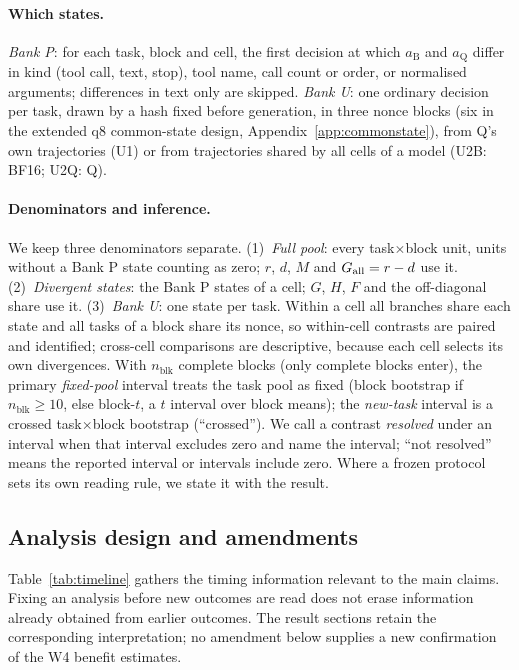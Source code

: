 \paragraph{Which states.} \emph{Bank P}: for each task, block and cell, the first decision at which $a_{\mathrm{B}}$ and $a_{\mathrm{Q}}$ differ in kind (tool call, text, stop), tool name, call count or order, or normalised arguments; differences in text only are skipped. \emph{Bank U}: one ordinary decision per task, drawn by a hash fixed before generation, in three nonce blocks (six in the extended q8 common-state design, Appendix~\ref{app:commonstate}), from Q's own trajectories (U1) or from trajectories shared by all cells of a model (U2B: BF16; U2Q: Q). %

\paragraph{Denominators and inference.} We keep three denominators separate. (1)~\emph{Full pool}: every task$\times$block unit, units without a Bank P state counting as zero; $r$, $d$, $M$ and $G_{\mathrm{all}}=r-d$ use it. (2)~\emph{Divergent states}: the Bank P states of a cell; $G$, $H$, $F$ and the off-diagonal share use it. (3)~\emph{Bank U}: one state per task. Within a cell all branches share each state and all tasks of a block share its nonce, so within-cell contrasts are paired and identified; cross-cell comparisons are descriptive, because each cell selects its own divergences. With $n_{\mathrm{blk}}$ complete blocks (only complete blocks enter), the primary \emph{fixed-pool} interval treats the task pool as fixed (block bootstrap if $n_{\mathrm{blk}}\ge10$, else block-$t$, a $t$ interval over block means); the \emph{new-task} interval is a crossed task$\times$block bootstrap (``crossed''). We call a contrast \emph{resolved} under an interval when that interval excludes zero and name the interval; ``not resolved'' means the reported interval or intervals include zero. Where a frozen protocol sets its own reading rule, we state it with the result. %


\subsection{Analysis design and amendments}
\label{app:timeline}

Table~\ref{tab:timeline} gathers the timing information relevant to the main claims. Fixing an analysis before new outcomes are read does not erase information already obtained from earlier outcomes. The result sections retain the corresponding interpretation; no amendment below supplies a new confirmation of the W4 benefit estimates.

